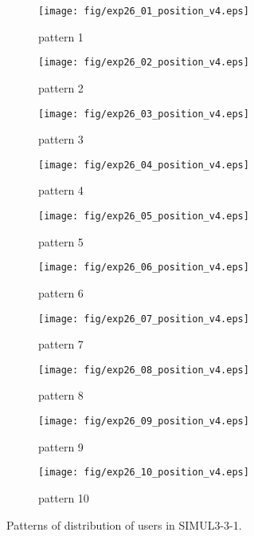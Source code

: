 \begin{figure}
	\begin{center}
		\begin{subfigure}[b]{0.32\textwidth}
			\texttt{[image: fig/exp26\_01\_position\_v4.eps]}
			\caption{pattern 1}
			\label{figure:simul3_3_1_a}
		\end{subfigure}
		\begin{subfigure}[b]{0.32\textwidth}
			\texttt{[image: fig/exp26\_02\_position\_v4.eps]}
			\caption{pattern 2}
			\label{figure:simul3_3_1_b}
		\end{subfigure}
		\begin{subfigure}[b]{0.32\textwidth}
			\texttt{[image: fig/exp26\_03\_position\_v4.eps]}
			\caption{pattern 3}
			\label{figure:simul3_3_1_c}
		\end{subfigure}
		\begin{subfigure}[b]{0.32\textwidth}
			\texttt{[image: fig/exp26\_04\_position\_v4.eps]}
			\caption{pattern 4}
			\label{figure:simul3_3_1_d}
		\end{subfigure}
		\begin{subfigure}[b]{0.32\textwidth}
			\texttt{[image: fig/exp26\_05\_position\_v4.eps]}
			\caption{pattern 5}
			\label{figure:simul3_3_1_e}
		\end{subfigure}
		\begin{subfigure}[b]{0.32\textwidth}
			\texttt{[image: fig/exp26\_06\_position\_v4.eps]}
			\caption{pattern 6}
			\label{figure:simul3_3_1_f}
		\end{subfigure}
		\begin{subfigure}[b]{0.32\textwidth}
			\texttt{[image: fig/exp26\_07\_position\_v4.eps]}
			\caption{pattern 7}
			\label{figure:simul3_3_1_g}
		\end{subfigure}
		\begin{subfigure}[b]{0.32\textwidth}
			\texttt{[image: fig/exp26\_08\_position\_v4.eps]}
			\caption{pattern 8}
			\label{figure:simul3_3_1_h}
		\end{subfigure}
		\begin{subfigure}[b]{0.32\textwidth}
			\texttt{[image: fig/exp26\_09\_position\_v4.eps]}
			\caption{pattern 9}
			\label{figure:simul3_3_1_i}
		\end{subfigure}
		\begin{subfigure}[b]{0.32\textwidth}
			\texttt{[image: fig/exp26\_10\_position\_v4.eps]}
			\caption{pattern 10}
			\label{figure:simul3_3_1_j}
		\end{subfigure}
		\caption{Patterns of distribution of users in SIMUL3-3-1.}
		\label{figure:simul3_3_1_p}
	\end{center}
\end{figure}

